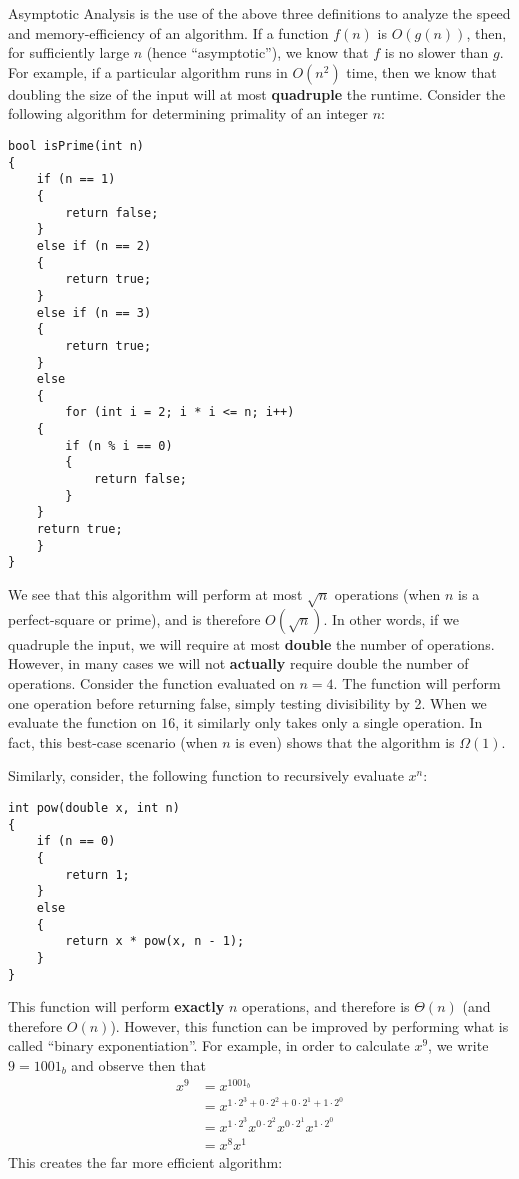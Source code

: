 \documentclass[a4paper]{article}
\begin{document}
Asymptotic Analysis is the use of the above three definitions to analyze the speed and memory-efficiency of an algorithm. If a function $f(n)$ is $O(g(n))$, then, for sufficiently large $n$ (hence ``asymptotic''), we know that $f$ is no slower than $g$. For example, if a particular algorithm runs in $O(n^2)$ time, then we know that doubling the size of the input will at most \textbf{quadruple} the runtime. Consider the following algorithm for determining primality of an integer $n$:

\begin{verbatim}
bool isPrime(int n)
{
    if (n == 1)
    {
        return false;
    }
    else if (n == 2)
    {
        return true;
    }
    else if (n == 3)
    {
        return true;
    }
    else
    {
        for (int i = 2; i * i <= n; i++)
    {
        if (n % i == 0)
        {
            return false;
        }
    }
    return true;
    }
}
\end{verbatim}

We see that this algorithm will perform at most $\sqrt{n}$ operations (when $n$ is a perfect-square or prime), and is therefore $O(\sqrt{n})$. In other words, if we quadruple the input, we will require at most \textbf{double} the number of operations. However, in many cases we will not \textbf{actually} require double the number of operations. Consider the function evaluated on $n=4$. The function will perform one operation before returning false, simply testing divisibility by 2. When we evaluate the function on $16$, it similarly only takes only a single operation. In fact, this best-case scenario (when $n$ is even) shows that the algorithm is $\Omega(1)$. 

Similarly, consider, the following function to recursively evaluate $x^n$:
\begin{verbatim}
int pow(double x, int n)
{
	if (n == 0)
	{
		return 1;
	}
	else
    {
		return x * pow(x, n - 1);
    }
}
\end{verbatim}

This function will perform \textbf{exactly} $n$ operations, and therefore is $\Theta(n)$ (and therefore $O(n)$). However, this function can be improved by performing what is called ``binary exponentiation''. For example, in order to calculate $x^9$, we write $9=1001_b$ and observe then that\begin{align*}x^9&=x^{1001_b}\\&=x^{1\cdot2^3+0\cdot2^2+0\cdot2^1+1\cdot2^0}\\&=x^{1\cdot2^3}x^{0\cdot2^2}x^{0\cdot2^1}x^{1\cdot2^0}\\&=x^8x^1\end{align*} This creates the far more efficient algorithm:
\end{document}

